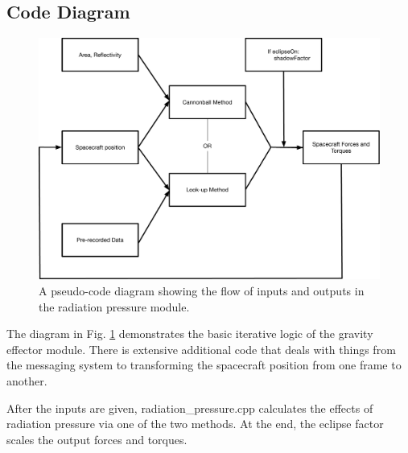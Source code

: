 \subsection{Code Diagram}

\begin{figure}[H]
	\centering \includegraphics[height=0.6\textwidth, keepaspectratio]{Figures/codeFlow.pdf}
	\caption{A pseudo-code diagram showing the flow of inputs and outputs in the radiation pressure module.}
	\label{img:codeFlow}
\end{figure}

The diagram in Fig. \ref{img:codeFlow} demonstrates the basic iterative logic of the gravity effector module. There is extensive additional code that deals with things from the messaging system to transforming the spacecraft position from one frame to another.

After the inputs are given, radiation\_pressure.cpp calculates the effects of radiation pressure via one of the two methods. At the end, the eclipse factor scales the output forces and torques.
